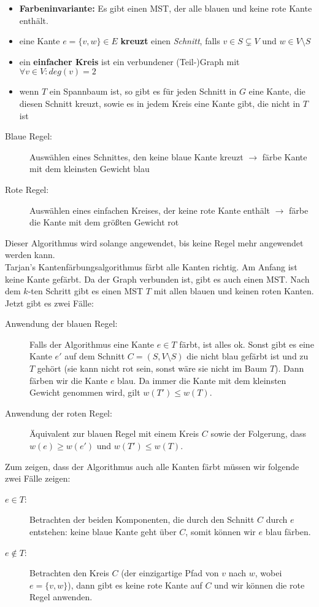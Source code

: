 \begin{itemize}
	\item \textbf{Farbeninvariante:} Es gibt einen MST, der alle blauen und keine rote Kante enthält.
	\item eine Kante $e=\{v,w\}\in E$ \textbf{kreuzt} einen \emph{Schnitt}, falls $v \in S \subsetneq V$ und $w \in V \setminus S$
	\item ein \textbf{einfacher Kreis} ist ein verbundener (Teil-)Graph mit $\forall v \in V : deg(v)=2$
	\item wenn $T$ ein Spannbaum ist, so gibt es für jeden Schnitt in $G$ eine Kante, die diesen Schnitt kreuzt, sowie es in jedem Kreis eine Kante gibt, die nicht in $T$ ist
\end{itemize}
\begin{description}
	\item[Blaue Regel:] Auswählen eines Schnittes, den keine blaue Kante kreuzt $\rightarrow$ färbe Kante mit dem kleinsten Gewicht blau
	\item[Rote Regel:] Auswählen eines einfachen Kreises, der keine rote Kante enthält $\rightarrow$ färbe die Kante mit dem größten Gewicht rot
\end{description}
Dieser Algorithmus wird solange angewendet, bis keine Regel mehr angewendet werden kann.
\topbreak
\up\ \\Tarjan's Kantenfärbungsalgorithmus färbt alle Kanten richtig.
\up\Proof
Am Anfang ist keine Kante gefärbt. Da der Graph verbunden ist, gibt es auch einen MST. Nach dem $k$-ten Schritt gibt es einen MST $T$ mit allen blauen und keinen roten Kanten. Jetzt gibt es zwei Fälle:
\begin{description}
	\item[Anwendung der blauen Regel:] Falls der Algorithmus eine Kante $e \in T$ färbt, ist alles ok. Sonst gibt es eine Kante $e'$ auf dem Schnitt $C=(S,V\setminus S)$ die nicht blau gefärbt ist und zu $T$ gehört (sie kann nicht rot sein, sonst wäre sie nicht im Baum $T$). Dann färben wir die Kante $e$ blau. Da immer die Kante mit dem kleinsten Gewicht genommen wird, gilt $w(T')\leq w(T)$.
	\item[Anwendung der roten Regel:] Äquivalent zur blauen Regel mit einem Kreis $C$ sowie der Folgerung, dass $w(e) \geq w(e')$ und $w(T')\leq w(T)$.
\end{description}
Zum zeigen, dass der Algorithmus auch alle Kanten färbt müssen wir folgende zwei Fälle zeigen:
\begin{description}
	\item[$e \in T$:] Betrachten der beiden Komponenten, die durch den Schnitt $C$ durch $e$ entstehen: keine blaue Kante geht über $C$, somit können wir $e$ blau färben.
	\item[$e \notin T$:] Betrachten den Kreis $C$ (der einzigartige Pfad von $v$ nach $w$, wobei $e=\{v,w\}$), dann gibt es keine rote Kante auf $C$ und wir können die rote Regel anwenden.
\end{description}\ \\
